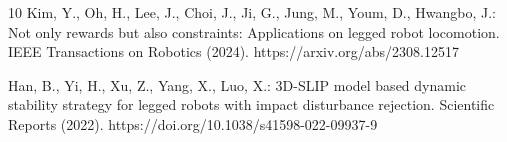 \documentclass{llncs}
\begin{document}
\begin{thebibliography}{10}
Kim, Y., Oh, H., Lee, J., Choi, J., Ji, G., Jung, M., Youm, D., Hwangbo, J.: Not only rewards
but also constraints: Applications on legged robot locomotion. IEEE Transactions on Robotics
(2024). https://arxiv.org/abs/2308.12517

Han, B., Yi, H., Xu, Z., Yang, X., Luo, X.: 3D-SLIP model based dynamic stability strategy for
legged robots with impact disturbance rejection. Scientific Reports (2022).
https://doi.org/10.1038/s41598-022-09937-9

\end{thebibliography}
\end{document}
